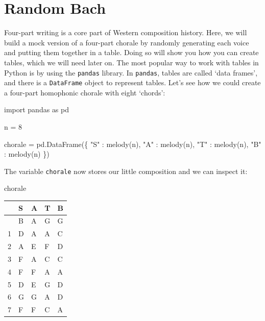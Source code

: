 \documentclass[
  a4paperpaper,
  ,captions=tableheading
]{scrbook}
\newenvironment{Shaded}{\begin{snugshade}}{\end{snugshade}}
\newcommand{\DecValTok}[1]{\textcolor[rgb]{0.68,0.00,0.00}{#1}}
\newcommand{\ImportTok}[1]{\textcolor[rgb]{0.00,0.46,0.62}{#1}}
\newcommand{\NormalTok}[1]{\textcolor[rgb]{0.00,0.23,0.31}{#1}}
\newcommand{\OperatorTok}[1]{\textcolor[rgb]{0.37,0.37,0.37}{#1}}
\newcommand{\StringTok}[1]{\textcolor[rgb]{0.13,0.47,0.30}{#1}}
\begin{document}
\hypertarget{random-bach}{%
\section{Random Bach}\label{random-bach}}

Four-part writing is a core part of Western composition history. Here,
we will build a mock version of a four-part chorale by randomly
generating each voice and putting them together in a table. Doing so
will show you how you can create tables, which we will need later on.
The most popular way to work with tables in Python is by using the
\texttt{pandas} library. In \texttt{pandas}, tables are called `data
frames', and there is a \texttt{DataFrame} object to represent tables.
Let's see how we could create a four-part homophonic chorale with eight
`chords':

\begin{Shaded}
\begin{Highlighting}[]
\ImportTok{import}\NormalTok{ pandas }\ImportTok{as}\NormalTok{ pd}

\NormalTok{n }\OperatorTok{=} \DecValTok{8}

\NormalTok{chorale }\OperatorTok{=}\NormalTok{ pd.DataFrame(\{}
    \StringTok{"S"}\NormalTok{ : melody(n),}
    \StringTok{"A"}\NormalTok{ : melody(n),}
    \StringTok{"T"}\NormalTok{ : melody(n),}
    \StringTok{"B"}\NormalTok{ : melody(n)}
\NormalTok{\})}
\end{Highlighting}
\end{Shaded}

The variable \texttt{chorale} now stores our little composition and we
can inspect it:

\begin{Shaded}
\begin{Highlighting}[]
\NormalTok{chorale}
\end{Highlighting}
\end{Shaded}

\begin{longtable}[]{@{}lllll@{}}
\toprule\noalign{}
& S & A & T & B \\
\midrule\noalign{}
\endhead
\bottomrule\noalign{}
\endlastfoot
0 & B & A & G & G \\
1 & D & A & A & C \\
2 & A & E & F & D \\
3 & F & A & C & C \\
4 & F & F & A & A \\
5 & D & E & G & D \\
6 & G & G & A & D \\
7 & F & F & C & A \\
\end{longtable}
\end{document}
